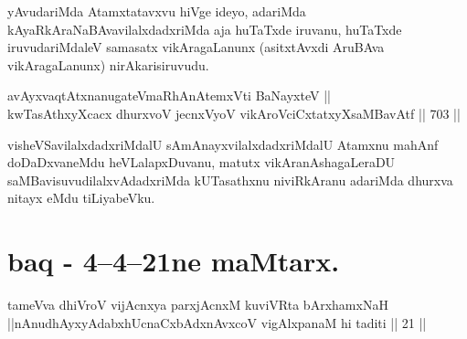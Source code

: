 \begin{artha} 
yAvudariMda Atamxtatavxvu hiVge ideyo, adariMda kAyaRkAraNaBAvavilalxdadxriMda aja huTaTxde iruvanu, huTaTxde iruvudariMdaleV samasatx vikAragaLanunx (asitxtAvxdi AruBAva vikAragaLanunx) nirAkarisiruvudu.
\end{artha}

\begin{shl}
avAyxvaqtAtxnanugateVmaRhAnAtemxVti BaNayxteV || \\
kwTasAthxyXcacx dhurxvoV jecnxVyoV vikAroVciCxtatxyXsaMBavAtf \hfill || 703 ||  
\end{shl}

\begin{artha} 
visheVSavilalxdadxriMdalU sAmAnayxvilalxdadxriMdalU Atamxnu mahAnf doDaDxvaneMdu heVLalapxDuvanu, matutx vikAranAshagaLeraDU saMBavisuvudilalxvAdadxriMda kUTasathxnu niviRkAranu adariMda dhurxva nitayx eMdu tiLiyabeVku.
\end{artha}

\section*{baq - 4{\rm --}4{\rm --}21ne maMtarx.}

\begin{shl}
tameVva dhiVroV vijAcnxya parxjAcnxM kuviVRta bArxhamxNaH ||nAnudhAyxyAdabxhUcnaCxbAdxnAvxcoV vigAlxpanaM hi taditi || 21 ||
\end{shl}



